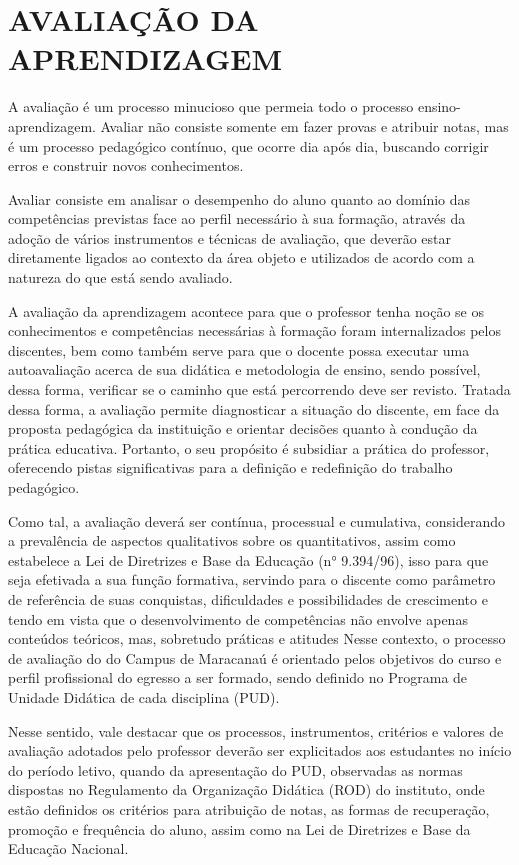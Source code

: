 \section{AVALIAÇÃO DA APRENDIZAGEM}

A avaliação é um processo minucioso que permeia todo o processo ensino-aprendizagem. Avaliar não consiste somente em fazer provas e atribuir notas, mas é um processo pedagógico contínuo, que ocorre dia após dia, buscando corrigir erros e construir novos conhecimentos.

Avaliar consiste em analisar o desempenho do aluno quanto ao domínio das competências previstas face ao perfil necessário à sua formação, através da adoção de vários instrumentos e técnicas de avaliação, que deverão estar diretamente ligados ao contexto da área objeto e utilizados de acordo com a natureza do que está sendo avaliado.

A avaliação da aprendizagem acontece para que o professor tenha noção se os conhecimentos e competências necessárias à formação foram internalizados pelos discentes, bem como também serve para que o docente possa executar uma autoavaliação acerca de sua didática e metodologia de ensino, sendo possível, dessa forma, verificar se o caminho que está percorrendo deve ser revisto. Tratada dessa forma, a avaliação permite diagnosticar a situação do discente, em face da proposta pedagógica da instituição e orientar decisões quanto à condução da prática educativa. Portanto, o seu propósito é subsidiar a prática do professor, oferecendo pistas significativas para a definição e redefinição do trabalho pedagógico.

Como tal, a avaliação deverá ser contínua, processual e cumulativa, considerando a prevalência de aspectos qualitativos sobre os quantitativos, assim como estabelece a Lei de Diretrizes e Base da Educação (n° 9.394/96), isso para que seja efetivada a sua função formativa, servindo para o discente como parâmetro de referência de suas conquistas, dificuldades e possibilidades de crescimento e tendo em vista que o desenvolvimento de competências não envolve apenas conteúdos teóricos, mas, sobretudo práticas e atitudes
Nesse contexto, o processo de avaliação do \NOMECURSO do Campus de Maracanaú é orientado pelos objetivos do curso e perfil profissional do egresso a ser formado, sendo definido no Programa de Unidade Didática de cada disciplina (PUD).

Nesse sentido, vale destacar que os processos, instrumentos, critérios e valores de avaliação adotados pelo professor deverão ser explicitados aos estudantes no início do período letivo, quando da apresentação do PUD, observadas as normas dispostas no Regulamento da Organização Didática (ROD) do instituto, onde estão definidos os critérios para atribuição de notas, as formas de recuperação, promoção e frequência do aluno, assim como na Lei de Diretrizes e Base da Educação Nacional.

